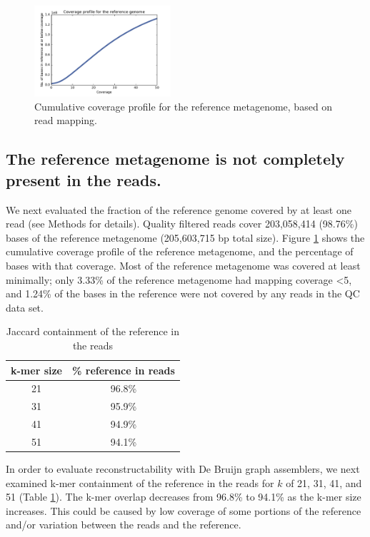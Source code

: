 \documentclass[11pt]{article}
\begin{document}
\begin{figure}[!h]

  
\centering
\includegraphics[width=0.45\textwidth]{CoverageProfile.pdf}  
\caption{\label{fig:coverage-profile} Cumulative coverage profile for the reference metagenome, based on read mapping. }
\end{figure}

\subsection*{The reference metagenome is not completely present in the reads.}

We next evaluated the fraction of the reference genome covered by at least
one read (see Methods for details). Quality filtered reads cover
203,058,414 (98.76\%) bases of the reference metagenome (205,603,715
bp total size).  Figure \ref{fig:coverage-profile} shows the
cumulative coverage profile of the reference metagenome, and the
percentage of bases with that coverage. Most of the reference
metagenome was covered at least minimally; only 3.33\% of the
reference metagenome had mapping coverage \textless 5, and 1.24\% of
the bases in the reference were not covered by any reads in the QC data
set.

\begin{table}[t]
\caption{Jaccard containment of the reference in the reads}
\centering
\begin{tabular}{|c|c|}
\hline
\textbf{k-mer size} & {\textbf \% reference in reads } \\ [0.5ex]
\hline
21 & 96.8\% \\
\hline
31 & 95.9\% \\
\hline
41 & 94.9\% \\
\hline
51 & 94.1\% \\
\hline
\end{tabular}
\label{table:ref_in_reads}
\end{table}

In order to evaluate reconstructability with De Bruijn graph
assemblers, we next examined k-mer containment of the reference in the
reads for $k$ of 21, 31, 41, and 51 (Table \ref{table:ref_in_reads}).
The k-mer overlap decreases from 96.8\% to 94.1\% as the k-mer size
increases. This could be caused by low coverage of some portions
of the reference and/or variation between the reads and the reference.
\end{document}
